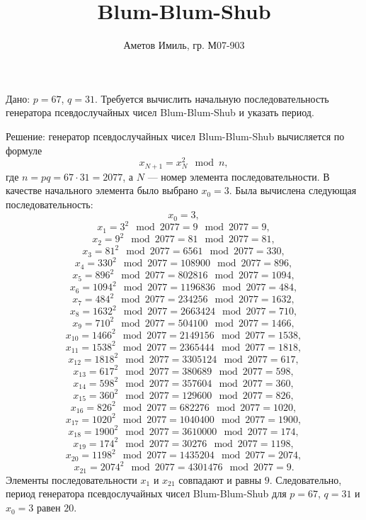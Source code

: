 \documentclass[10pt]{article}
\author{Аметов Имиль, гр. М07-903}
\title{Blum-Blum-Shub}
\begin{document}
\maketitle
Дано: $p = 67$, $q = 31$. Требуется вычислить начальную последовательность генератора псевдослучайных чисел Blum-Blum-Shub и указать период.

Решение: генератор псевдослучайных чисел Blum-Blum-Shub вычисляется по формуле $$x_{N+1} = x_N^2 \mod {n},$$ где $n = pq = 67 \cdot 31 = 2077$, а $N$ --- номер элемента последовательности.
В качестве начального элемента было выбрано $x_0 = 3$. Была вычислена следующая последовательность: $$x_0 = 3,$$ $$x_1 = 3^2 \mod 2077 = 9 \mod 2077 = 9,$$
$$x_2 = 9^2 \mod 2077 = 81 \mod 2077 = 81,$$
$$x_3 = 81^2 \mod 2077 = 6561 \mod 2077 = 330,$$
$$x_4 = 330^2 \mod 2077 = 108900 \mod 2077 = 896,$$
$$x_5 = 896^2 \mod 2077 = 802816 \mod 2077 = 1094,$$
$$x_6 = 1094^2 \mod 2077 = 1196836 \mod 2077 = 484,$$
$$x_7 = 484^2 \mod 2077 = 234256 \mod 2077 = 1632,$$
$$x_8 = 1632^2 \mod 2077 = 2663424 \mod 2077 = 710,$$
$$x_9 = 710^2 \mod 2077 = 504100 \mod 2077 = 1466,$$
$$x_{10} = 1466^2 \mod 2077 = 2149156 \mod 2077 = 1538,$$
$$x_{11} = 1538^2 \mod 2077 = 2365444 \mod 2077 = 1818,$$
$$x_{12} = 1818^2 \mod 2077 =3305124 \mod 2077 = 617,$$
$$x_{13} = 617^2 \mod 2077 = 380689 \mod 2077 = 598,$$
$$x_{14} = 598^2 \mod 2077 = 357604 \mod 2077 = 360,$$
$$x_{15} = 360^2 \mod 2077 = 129600 \mod 2077 = 826,$$
$$x_{16} = 826^2 \mod 2077 = 682276 \mod 2077 = 1020,$$
$$x_{17} = 1020^2 \mod 2077 = 1040400 \mod 2077 = 1900,$$
$$x_{18} = 1900^2 \mod 2077 = 3610000 \mod 2077 = 174,$$
$$x_{19} = 174^2 \mod 2077 = 30276 \mod 2077 = 1198,$$
$$x_{20} = 1198^2 \mod 2077 = 1435204 \mod 2077 = 2074,$$
$$x_{21} = 2074^2 \mod 2077 = 4301476 \mod 2077 = 9.$$
Элементы последовательности $x_1$ и $x_{21}$ совпадают и равны $9$. Следовательно, период генератора псевдослучайных чисел Blum-Blum-Shub для $p = 67$, $q = 31$ и $x_0 = 3$ равен $20$.
\end{document}

